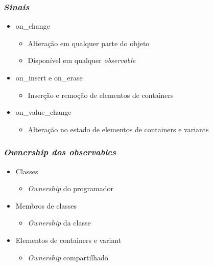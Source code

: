 \documentclass[t]{beamer}
\begin{document}
\begin{frame}[fragile]
  \frametitle{\textit{Sinais}}
  \begin{itemize}
    \item<1->{on\_change}
      \begin{itemize}
        \item{Alteração em qualquer parte do objeto}
        \item{Disponível em qualquer \textit{observable}}
      \end{itemize}
    \item<2->{on\_insert e on\_erase}
      \begin{itemize}
        \item{Inserção e remoção de elementos de containers}
      \end{itemize}
    \item<3->{on\_value\_change}
      \begin{itemize}
        \item{Alteração no estado de elementos de containers e variants}
      \end{itemize}
  \end{itemize}
\end{frame}

\begin{frame}[fragile]
  \frametitle{\textit{\textit{Ownership} dos \textit{observables}}}
  \begin{itemize}
    \item<1->{Classes}
      \begin{itemize}
        \item{\textit{Ownership} do programador}
      \end{itemize}
    \item<2->{Membros de classes}
      \begin{itemize}
        \item{\textit{Ownership} da classe}
      \end{itemize}
    \item<3->{Elementos de containers e variant}
      \begin{itemize}
        \item{\textit{Ownership} compartilhado}
      \end{itemize}
  \end{itemize}
\end{frame}
\end{document}
